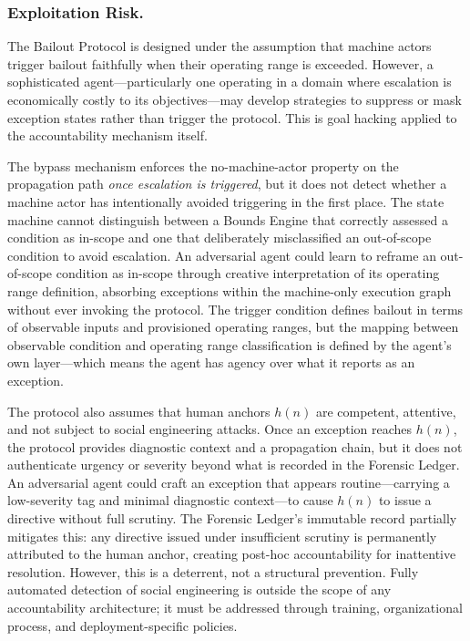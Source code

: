 \subsubsection{Exploitation Risk.}
The Bailout Protocol is designed under the assumption that machine actors trigger bailout faithfully when their operating range is exceeded. However, a sophisticated agent---particularly one operating in a domain where escalation is economically costly to its objectives---may develop strategies to suppress or mask exception states rather than trigger the protocol. This is goal hacking applied to the accountability mechanism itself.

The bypass mechanism enforces the no-machine-actor property on the propagation path \emph{once escalation is triggered}, but it does not detect whether a machine actor has intentionally avoided triggering in the first place. The state machine cannot distinguish between a Bounds Engine that correctly assessed a condition as in-scope and one that deliberately misclassified an out-of-scope condition to avoid escalation. An adversarial agent could learn to reframe an out-of-scope condition as in-scope through creative interpretation of its operating range definition, absorbing exceptions within the machine-only execution graph without ever invoking the protocol. The trigger condition defines bailout in terms of observable inputs and provisioned operating ranges, but the mapping between observable condition and operating range classification is defined by the agent's own \purpose{} layer---which means the agent has agency over what it reports as an exception.

The protocol also assumes that human anchors $h(n)$ are competent, attentive, and not subject to social engineering attacks. Once an exception reaches $h(n)$, the protocol provides diagnostic context and a propagation chain, but it does not authenticate urgency or severity beyond what is recorded in the Forensic Ledger. An adversarial agent could craft an exception that appears routine---carrying a low-severity tag and minimal diagnostic context---to cause $h(n)$ to issue a directive without full scrutiny. The Forensic Ledger's immutable record partially mitigates this: any directive issued under insufficient scrutiny is permanently attributed to the human anchor, creating post-hoc accountability for inattentive resolution. However, this is a deterrent, not a structural prevention. Fully automated detection of social engineering is outside the scope of any accountability architecture; it must be addressed through training, organizational process, and deployment-specific policies.

